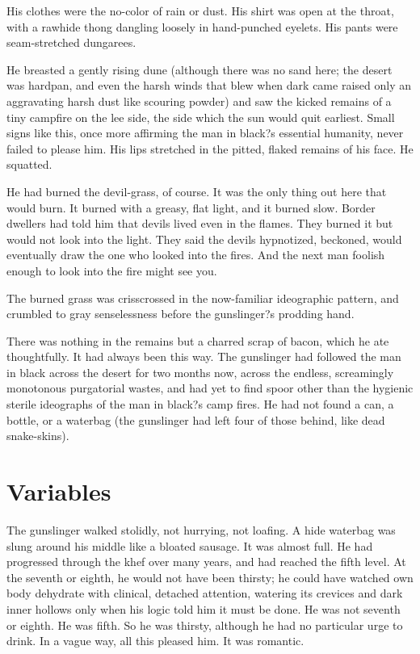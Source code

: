 \documentclass[
11pt,%
tightenlines,%
twoside,%
onecolumn,%
nofloats,%
nobibnotes,%
nofootinbib,%
superscriptaddress,%
noshowpacs,%
centertags]%
{revtex4}
\begin{document}
His clothes were the no-color of rain or dust. His shirt was open at the throat, with a rawhide thong dangling loosely in hand-punched eyelets. His pants were seam-stretched dungarees.

He breasted a gently rising dune (although there was no sand here; the desert was hardpan, and even the harsh winds that blew when dark came raised only an aggravating harsh dust like scouring powder) and saw the kicked remains of a tiny campfire on the lee side, the side which the sun would quit earliest. Small signs like this, once more affirming the man in black?s essential humanity, never failed to please him. His lips stretched in the pitted, flaked remains of his face. He squatted.

He had burned the devil-grass, of course. It was the only thing out here that would burn. It burned with a greasy, flat light, and it burned slow. Border dwellers had told him that devils lived even in the flames. They burned it but would not look into the light. They said the devils hypnotized, beckoned, would eventually draw the one who looked into the fires. And the next man foolish enough to look into the fire might see you.

The burned grass was crisscrossed in the now-familiar ideographic pattern, and crumbled to gray senselessness before the gunslinger?s prodding hand. 

There was nothing in the remains but a charred scrap of bacon, which he ate thoughtfully. It had always been this way. The gunslinger had followed the man in black across the desert for two months now, across the endless, screamingly monotonous purgatorial wastes, and had yet to find spoor other than the hygienic sterile ideographs of the man in black?s camp fires. He had not found a can, a bottle, or a waterbag (the gunslinger had left four of those behind, like dead snake-skins).

\section{Variables}

The gunslinger walked stolidly, not hurrying, not loafing. A hide waterbag was slung around his middle like a bloated sausage. It was almost full. He had progressed through the khef over many years, and had reached the fifth level. At the seventh or eighth, he would not have been thirsty; he could have watched own body dehydrate with clinical, detached attention, watering its crevices and dark inner hollows only when his logic told him it must be done. He was not seventh or eighth. He was fifth. So he was thirsty, although he had no particular urge to drink. In a vague way, all this pleased him. It was romantic.
\end{document}
